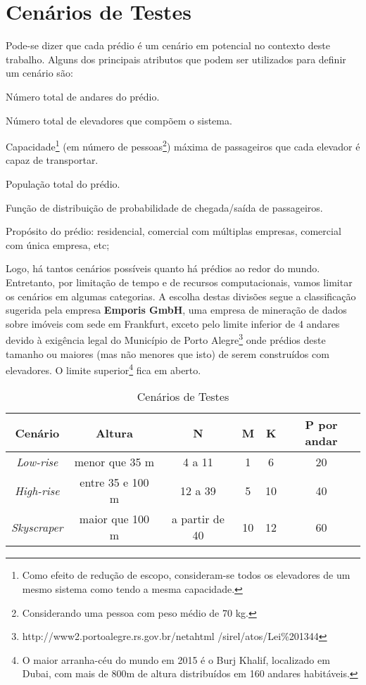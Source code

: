 \section{Cenários de Testes}

Pode-se dizer que cada prédio é um cenário em potencial no contexto deste
trabalho. Alguns dos principais atributos que podem ser utilizados para definir
um cenário são:

\begin{description}[leftmargin=!,labelwidth=\widthof{\bfseries Propósito}]
  \item[N]
  Número total de andares do prédio.
  \item[M]
  Número total de elevadores que compõem o sistema.
  \item[K]
  Capacidade\footnote{Como efeito de redução de escopo, consideram-se todos os
  elevadores de um mesmo sistema como tendo a mesma capacidade.} (em número de
  pessoas\footnote{Considerando uma pessoa com peso médio de 70 kg.}) máxima de
  passageiros que cada elevador é capaz de transportar.
  \item[P]
  População total do prédio.
  \item[F]
  Função de distribuição de probabilidade de chegada/saída de passageiros.
  \item[Propósito]
  Propósito do prédio: residencial, comercial com múltiplas empresas, comercial
  com única empresa, etc;
\end{description}

Logo, há tantos cenários possíveis quanto há prédios ao redor do mundo.
Entretanto, por limitação de tempo e de recursos computacionais, vamos limitar
os cenários em algumas categorias. A escolha destas divisões segue a
classificação sugerida pela empresa \textbf{Emporis GmbH}, uma empresa de
mineração de dados sobre imóveis com sede em Frankfurt, exceto pelo limite
inferior de 4 andares devido à exigência legal do Município de Porto
Alegre\footnote{http://www2.portoalegre.rs.gov.br/netahtml
/sirel/atos/Lei\%201344} onde prédios deste tamanho ou maiores (mas não menores
que isto) de serem construídos com elevadores. O limite superior\footnote{O
maior arranha-céu do mundo em 2015 é o Burj Khalif, localizado em Dubai, com
mais de 800m de altura distribuídos em 160 andares habitáveis.} fica em aberto.

\begin{table}[htb!]
\centering
\caption{Cenários de Testes}
\label{tab:cenarios}
\begin{tabular}{|c|c|c|c|c|c|}
\hline
{\bf Cenário} & {\bf Altura} & {\bf N}  & {\bf M} & {\bf K} & {\bf P por andar}
\\ \hline
{\it Low-rise}   & menor que 35 m    & 4 a 11         & 1  & 6  & 20 \\ \hline
{\it High-rise}  & entre 35 e 100 m  & 12 a 39        & 5  & 10 & 40 \\ \hline
{\it Skyscraper} & maior que 100 m   & a partir de 40 & 10 & 12 & 60 \\ \hline
\end{tabular}
\end{table}

